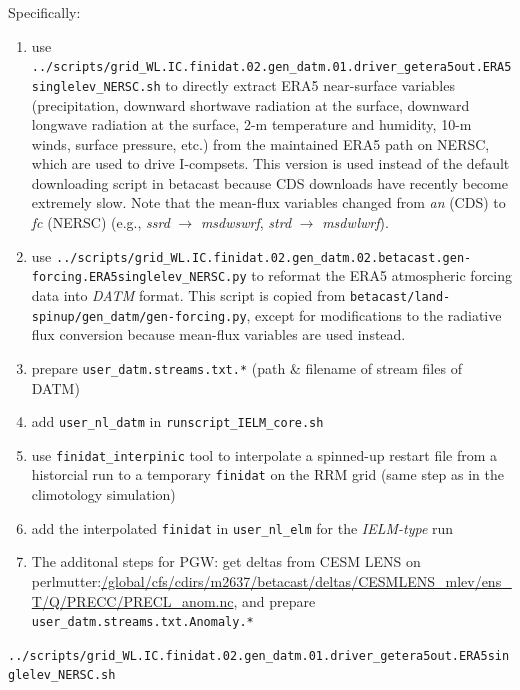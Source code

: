 \documentclass[journal abbreviation, manuscript]{copernicus}
\begin{document}
Specifically:
\begin{enumerate}
  \item use \lstinline|../scripts/grid_WL.IC.finidat.02.gen_datm.01.driver_getera5out.ERA5singlelev_NERSC.sh| to directly extract ERA5 near-surface variables (precipitation, downward shortwave radiation at the surface, downward longwave radiation at the surface, 2-m temperature and humidity, 10-m winds, surface pressure, etc.) from the maintained ERA5 path on NERSC, which are used to drive I-compsets. This version is used instead of the default downloading script in betacast because CDS downloads have recently become extremely slow. Note that the mean-flux variables changed from \emph{an} (CDS) to \emph{fc} (NERSC) (e.g., \emph{ssrd} $\rightarrow$ \emph{msdwswrf}, \emph{strd} $\rightarrow$ \emph{msdwlwrf}).

  \item use \lstinline|../scripts/grid_WL.IC.finidat.02.gen_datm.02.betacast.gen-forcing.ERA5singlelev_NERSC.py| to reformat the ERA5 atmospheric forcing data into \emph{DATM} format. This script is copied from \lstinline|betacast/land-spinup/gen_datm/gen-forcing.py|, except for modifications to the radiative flux conversion because mean-flux variables are used instead.

  \item prepare \verb|user_datm.streams.txt.*| (path \& filename of stream files of DATM)

  \item add \verb|user_nl_datm| in \verb|runscript_IELM_core.sh|

  \item use \verb|finidat_interpinic| tool to interpolate a spinned-up restart file from a historcial run to a temporary \verb|finidat| on the RRM grid (same step as in the climotology simulation)

  \item add the interpolated \verb|finidat| in \verb|user_nl_elm| for the \emph{IELM-type} run

  \item The additonal steps for PGW: get deltas from CESM LENS on perlmutter:\url{/global/cfs/cdirs/m2637/betacast/deltas/CESMLENS_mlev/ens_T/Q/PRECC/PRECL_anom.nc}, and prepare \verb|user_datm.streams.txt.Anomaly.*|
\end{enumerate}
\vspace{\baselineskip}


\lstinline|../scripts/grid_WL.IC.finidat.02.gen_datm.01.driver_getera5out.ERA5singlelev_NERSC.sh|
\end{document}
